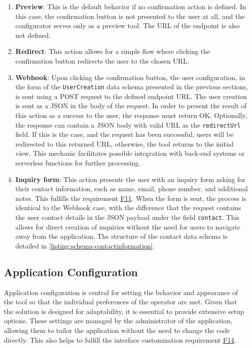 \begin{enumerate}
    \item \textbf{Preview}: This is the default behavior if no confirmation action is defined. In this case, the confirmation button is not presented to the user at all, and the configurator serves only as a preview tool. The URL of the endpoint is also not defined.
    \item \textbf{Redirect}: This action allows for a simple flow where clicking the confirmation button redirects the user to the chosen URL.
    \item \textbf{Webhook}: Upon clicking the confirmation button, the user configuration, in the form of the \texttt{UserCreation} data schema presented in the previous sections, is sent using a POST request to the defined endpoint URL. The user creation is sent as a JSON in the body of the request. In order to present the result of this action as a success to the user, the response must return OK. Optionally, the response can contain a JSON body with valid URL as the \texttt{redirectUrl} field. If this is the case, and the request has been successful, users will be redirected to this returned URL, otherwise, the tool returns to the initial view. This mechanic facilitates possible integration with back-end systems or serverless functions for further processing.
    \item \textbf{Inquiry form}: This action presents the user with an inquiry form asking for their contact information, such as name, email, phone number, and additional notes. This fulfills the requirement \hyperref[itm:F11]{F11}. When the form is sent, the process is identical to the Webhook case, with the difference that the request contains the user contact details in the JSON payload under the field \texttt{contact}. This allows for direct creation of inquiries without the need for users to navigate away from the application. The structure of the contact data schema is detailed in \autoref{listing:schema-contactinformation}.
\end{enumerate}


\subsection{Application Configuration}

Application configuration is central for setting the behavior and appearance of the tool so that the individual preferences of the operator are met. Given that the solution is designed for adaptability, it is essential to provide extensive setup options. These settings are managed by the administrator of the application, allowing them to tailor the application without the need to change the code directly. This also helps to fulfill the interface customization requirement \hyperref[itm:F14]{F14}.

